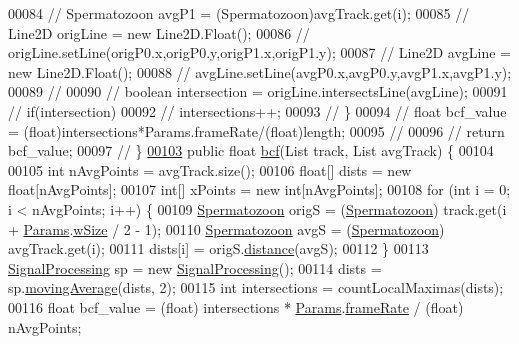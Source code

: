 \begin{DoxyCode}
00084   \textcolor{comment}{// Spermatozoon avgP1 = (Spermatozoon)avgTrack.get(i);}
00085   \textcolor{comment}{// Line2D origLine = new Line2D.Float();}
00086   \textcolor{comment}{// origLine.setLine(origP0.x,origP0.y,origP1.x,origP1.y);}
00087   \textcolor{comment}{// Line2D avgLine = new Line2D.Float();}
00088   \textcolor{comment}{// avgLine.setLine(avgP0.x,avgP0.y,avgP1.x,avgP1.y);}
00089   \textcolor{comment}{//}
00090   \textcolor{comment}{// boolean intersection = origLine.intersectsLine(avgLine);}
00091   \textcolor{comment}{// if(intersection)}
00092   \textcolor{comment}{// intersections++;}
00093   \textcolor{comment}{// \}}
00094   \textcolor{comment}{// float bcf\_value = (float)intersections*Params.frameRate/(float)length;}
00095   \textcolor{comment}{//}
00096   \textcolor{comment}{// return bcf\_value;}
00097   \textcolor{comment}{// \}}
\hypertarget{_kinematics_8java_source_l00103}{}\hyperlink{classfunctions_1_1_kinematics_ac35b9a912f923321eee5335c011f7c89}{00103} \textcolor{comment}{}  \textcolor{keyword}{public} \textcolor{keywordtype}{float} \hyperlink{classfunctions_1_1_kinematics_ac35b9a912f923321eee5335c011f7c89}{bcf}(List track, List avgTrack) \{
00104 
00105     \textcolor{keywordtype}{int} nAvgPoints = avgTrack.size();
00106     \textcolor{keywordtype}{float}[] dists = \textcolor{keyword}{new} \textcolor{keywordtype}{float}[nAvgPoints];
00107     \textcolor{keywordtype}{int}[] xPoints = \textcolor{keyword}{new} \textcolor{keywordtype}{int}[nAvgPoints];
00108     \textcolor{keywordflow}{for} (\textcolor{keywordtype}{int} i = 0; i < nAvgPoints; i++) \{
00109       \hyperlink{classdata_1_1_spermatozoon}{Spermatozoon} origS = (\hyperlink{classdata_1_1_spermatozoon}{Spermatozoon}) track.get(i + 
      \hyperlink{classdata_1_1_params}{Params}.\hyperlink{classdata_1_1_params_ad1b7844e5f66ee81c3de06d1a8ca645e}{wSize} / 2 - 1);
00110       \hyperlink{classdata_1_1_spermatozoon}{Spermatozoon} avgS = (\hyperlink{classdata_1_1_spermatozoon}{Spermatozoon}) avgTrack.get(i);
00111       dists[i] = origS.\hyperlink{classdata_1_1_spermatozoon_aaef7a8e7602a08c82ea5fcbb777883e0}{distance}(avgS);
00112     \}
00113     \hyperlink{classfunctions_1_1_signal_processing}{SignalProcessing} sp = \textcolor{keyword}{new} \hyperlink{classfunctions_1_1_signal_processing}{SignalProcessing}();
00114     dists = sp.\hyperlink{classfunctions_1_1_signal_processing_a4f10245c50d850b87d1ef4d81c28300d}{movingAverage}(dists, 2);
00115     \textcolor{keywordtype}{int} intersections = countLocalMaximas(dists);
00116     \textcolor{keywordtype}{float} bcf\_value = (float) intersections * \hyperlink{classdata_1_1_params}{Params}.\hyperlink{classdata_1_1_params_a398ccb086e2e7150576bec8a5853b8e3}{frameRate} / (\textcolor{keywordtype}{float}) nAvgPoints;

\end{DoxyCode}
